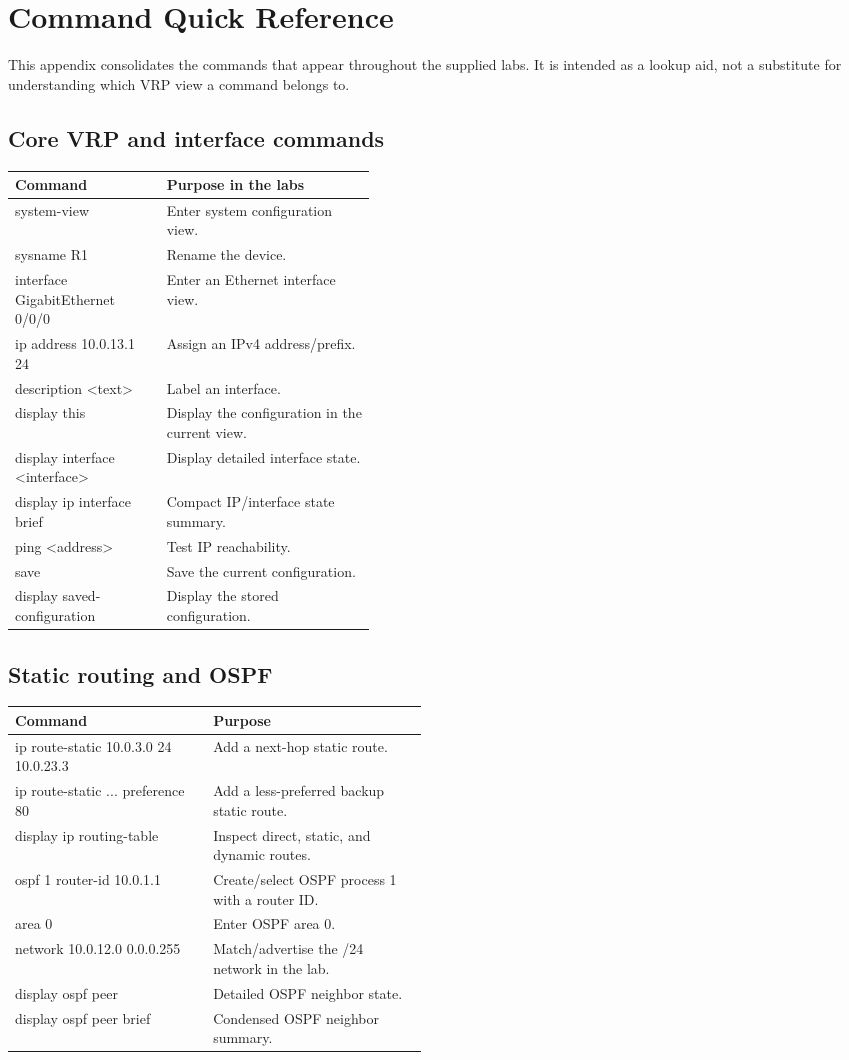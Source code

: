 \chapter*{Command Quick Reference}
This appendix consolidates the commands that appear throughout the supplied labs. It is intended as a lookup aid, not a substitute for understanding which VRP view a command belongs to.

\section*{Core VRP and interface commands}
\begin{tabularx}{\linewidth}{>{\ttfamily}p{0.42\linewidth}X}
\toprule
Command & Purpose in the labs\\\midrule
system-view & Enter system configuration view.\\
sysname R1 & Rename the device.\\
interface GigabitEthernet 0/0/0 & Enter an Ethernet interface view.\\
ip address 10.0.13.1 24 & Assign an IPv4 address/prefix.\\
description <text> & Label an interface.\\
display this & Display the configuration in the current view.\\
display interface <interface> & Display detailed interface state.\\
display ip interface brief & Compact IP/interface state summary.\\
ping <address> & Test IP reachability.\\
save & Save the current configuration.\\
display saved-configuration & Display the stored configuration.\\\bottomrule
\end{tabularx}

\section*{Static routing and OSPF}
\begin{tabularx}{\linewidth}{>{\ttfamily}p{0.48\linewidth}X}
\toprule
Command & Purpose\\\midrule
ip route-static 10.0.3.0 24 10.0.23.3 & Add a next-hop static route.\\
ip route-static ... preference 80 & Add a less-preferred backup static route.\\
display ip routing-table & Inspect direct, static, and dynamic routes.\\
ospf 1 router-id 10.0.1.1 & Create/select OSPF process 1 with a router ID.\\
area 0 & Enter OSPF area 0.\\
network 10.0.12.0 0.0.0.255 & Match/advertise the /24 network in the lab.\\
display ospf peer & Detailed OSPF neighbor state.\\
display ospf peer brief & Condensed OSPF neighbor summary.\\\bottomrule
\end{tabularx}

